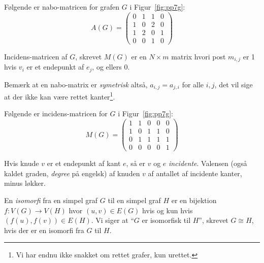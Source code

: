 Følgende er nabo-matricen for grafen $G$ i Figur~\ref{fig:pp7g}:
\begin{equation}
	A(G) = \begin{pmatrix}
		0 & 1 & 1 & 0 \\
		1 & 0 & 2 & 0 \\
		1 & 2 & 0 & 1 \\
		0 & 0 & 1 & 0
	\end{pmatrix}
\end{equation}

\begin{definition}
	Incidens-matricen af $G$, skrevet $M(G)$  er en $N \times m$ matrix hvori post $m_{i,j}$ er 1 hvis $v_{i}$ er et endepunkt af $e_{j}$, og ellers 0.
\end{definition}

Bemærk at en nabo-matrix er \textit{symetrisk} altså, $a_{i,j} = a_{j,i}$ for alle $i,j$, det vil sige at der ikke kan være rettet kanter\footnote{Vi har endnu ikke snakket om rettet grafer, kun urettet.}.

Følgende er incidens-matricen for $G$ i Figur~\ref{fig:pp7g}:
\begin{equation}
	M(G) = \begin{pmatrix}
		1 & 1 & 0 & 0 & 0 \\
		1 & 0 & 1 & 1 & 0 \\
		0 & 1 & 1 & 1 & 1 \\
		0 & 0 & 0 & 0 & 1
	\end{pmatrix}
\end{equation}

\begin{definition}
	Hvis knude $v$ er et endepunkt af kant $e$, så er $v$ og $e$ \textit{incidente}. Valensen (også kaldet graden, \textit{degree} på engelsk) af knuden $v$ af antallet af incidente kanter, minus løkker.
\end{definition}

\begin{definition}[Isomorfi]
	En \textit{isomorfi} fra en simpel graf $G$ til en simpel graf $H$ er en bijektion $f : V(G) \rightarrow V(H)$ hvor $(u,v) \in E(G)$ hvis og kun hvis $(f(u), f(v)) \in E(H)$. Vi siger at ``$G$ er isomorfisk til $H$'', skrevet $G \cong H$, hvis der er en isomorfi fra $G$ til $H$.
\end{definition}

